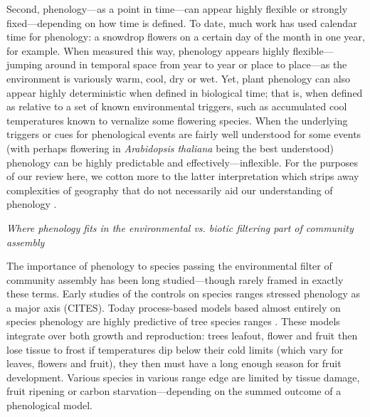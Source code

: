 \documentclass[11pt]{article}
\begin{document}
Second, phenology---as a point in time---can appear highly flexible or strongly fixed---depending on how time is defined. To date, much work has used calendar time for phenology: a snowdrop flowers on a certain day of the month in one year, for example. When measured this way, phenology appears highly flexible---jumping around in temporal space from year to year or place to place---as the environment is variously warm, cool, dry or wet. Yet, plant phenology can also appear highly deterministic when defined in biological time; that is, when defined as relative to a set of known environmental triggers, such as accumulated cool temperatures known to vernalize some flowering species. When the underlying triggers or cues for phenological events are fairly well understood for some events (with perhaps flowering in \emph{Arabidopsis thaliana} being the best understood) phenology can be highly predictable and effectively---inflexible. For the purposes of our review here, we cotton more to the latter interpretation which strips away complexities of geography that do not necessarily aid our understanding of phenology \citep{davies2013}. 

\emph{Where phenology fits in the environmental vs. biotic filtering part of community assembly}

The importance of phenology to species passing the environmental filter of community assembly has been long studied---though rarely framed in exactly these terms. Early studies of the controls on species ranges stressed phenology as a major axis (CITES). Today process-based models based almost entirely on species phenology are highly predictive of tree species ranges \citep[where they have been tested,][]{chuineJTB,Morin:2009gt,morin2007}. These models integrate over both growth and reproduction: trees leafout, flower and fruit then lose tissue to frost if temperatures dip below their cold limits (which vary for leaves, flowers and fruit), they then must have a long enough season for fruit development. Various species in various range edge are limited by tissue damage, fruit ripening or carbon starvation---depending on the summed outcome of a phenological model. 
\end{document}
